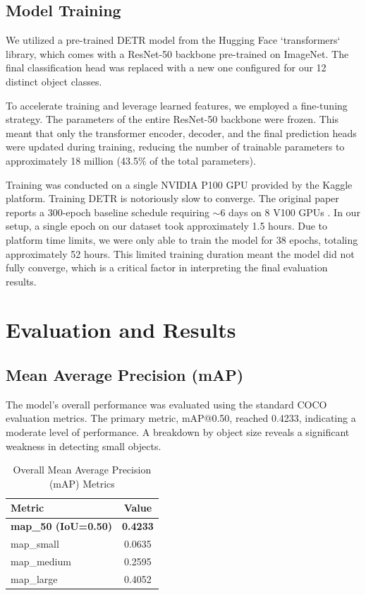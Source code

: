 \documentclass[10pt, conference]{IEEEtran}
\begin{document}
\subsection{Model Training}
We utilized a pre-trained DETR model from the Hugging Face `transformers` library, which comes with a ResNet-50 backbone pre-trained on ImageNet. The final classification head was replaced with a new one configured for our 12 distinct object classes.

To accelerate training and leverage learned features, we employed a fine-tuning strategy. The parameters of the entire ResNet-50 backbone were frozen. This meant that only the transformer encoder, decoder, and the final prediction heads were updated during training, reducing the number of trainable parameters to approximately 18 million (43.5\% of the total parameters).

Training was conducted on a single NVIDIA P100 GPU provided by the Kaggle platform. Training DETR is notoriously slow to converge. The original paper reports a 300-epoch baseline schedule requiring $\sim$6 days on 8 V100 GPUs \cite{carion2020end}. In our setup, a single epoch on our dataset took approximately 1.5 hours. Due to platform time limits, we were only able to train the model for 38 epochs, totaling approximately 52 hours. This limited training duration meant the model did not fully converge, which is a critical factor in interpreting the final evaluation results.

\section{Evaluation and Results}

\subsection{Mean Average Precision (mAP)}
The model's overall performance was evaluated using the standard COCO evaluation metrics. The primary metric, mAP@0.50, reached 0.4233, indicating a moderate level of performance. A breakdown by object size reveals a significant weakness in detecting small objects.

\begin{table}[h!]
\centering
\caption{Overall Mean Average Precision (mAP) Metrics}
\label{tab:map_overall}
\begin{tabular}{@{}lc@{}}
\toprule
\textbf{Metric} & \textbf{Value} \\ \midrule
\textbf{map\_50 (IoU=0.50)} & \textbf{0.4233} \\
map\_small          & 0.0635 \\
map\_medium         & 0.2595 \\
map\_large          & 0.4052 \\ \bottomrule
\end{tabular}
\end{table}
\end{document}

